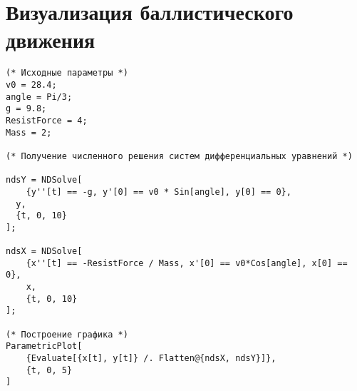 \newpage
\section[Визуализация баллистического движения]{Визуализация баллистического движения}

\begin{lstlisting}
(* Исходные параметры *)
v0 = 28.4;
angle = Pi/3;
g = 9.8;
ResistForce = 4;
Mass = 2;

(* Получение численного решения систем дифференциальных уравнений *)

ndsY = NDSolve[
	{y''[t] == -g, y'[0] == v0 * Sin[angle], y[0] == 0}, 
  y, 
  {t, 0, 10}
];
   
ndsX = NDSolve[
	{x''[t] == -ResistForce / Mass, x'[0] == v0*Cos[angle], x[0] == 0}, 
	x, 
	{t, 0, 10}
];

(* Построение графика *)
ParametricPlot[
	{Evaluate[{x[t], y[t]} /. Flatten@{ndsX, ndsY}]}, 
	{t, 0, 5}
] 

\end{lstlisting}
